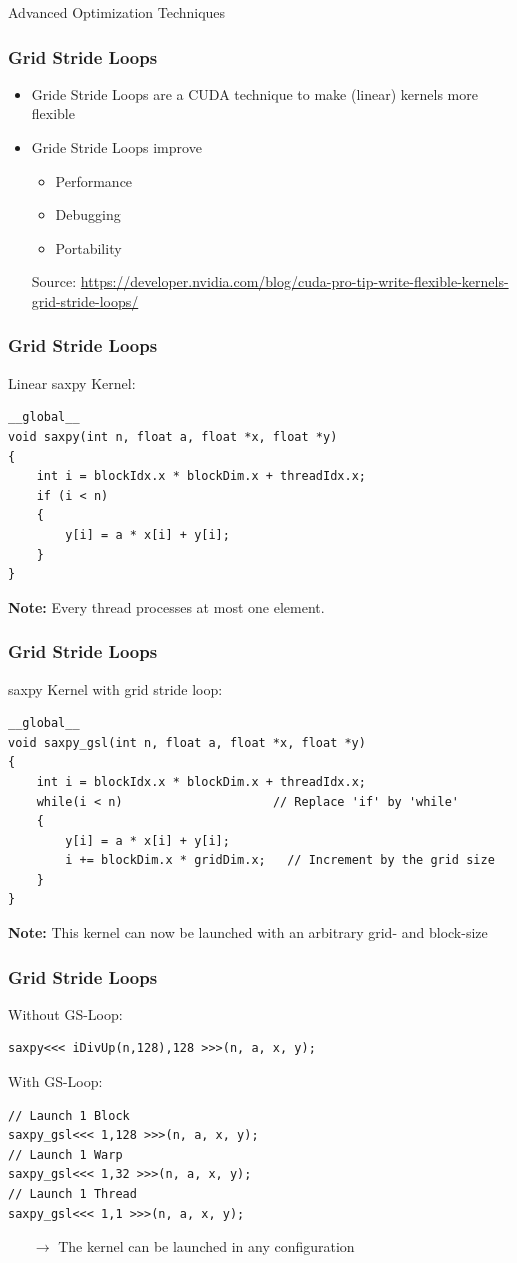 \documentclass[aspectratio=169,handout]{beamer}
\begin{document}
\frame
{
\begin{center}
\Large Advanced Optimization Techniques
\end{center}
}


\begin{frame}[fragile]
\frametitle{Grid Stride Loops}

\begin{itemize}
\item Gride Stride Loops are a CUDA technique to make (linear) kernels more flexible
\item Gride Stride Loops improve
\begin{itemize}
\item Performance
\item Debugging
\item Portability
\end{itemize}
Source: \url{https://developer.nvidia.com/blog/cuda-pro-tip-write-flexible-kernels-grid-stride-loops/}
\end{itemize}
\end{frame}


\begin{frame}[fragile]
\frametitle{Grid Stride Loops}
Linear saxpy Kernel:
\begin{lstlisting}
__global__
void saxpy(int n, float a, float *x, float *y)
{
	int i = blockIdx.x * blockDim.x + threadIdx.x;
	if (i < n) 
	{
		y[i] = a * x[i] + y[i];
	}
}
\end{lstlisting}
\textbf{Note:} Every thread processes at most one element.
\end{frame}


\begin{frame}[fragile]
\frametitle{Grid Stride Loops}
saxpy Kernel with grid stride loop:
\begin{lstlisting}
__global__
void saxpy_gsl(int n, float a, float *x, float *y)
{
	int i = blockIdx.x * blockDim.x + threadIdx.x; 
	while(i < n)                     // Replace 'if' by 'while'
	{
		y[i] = a * x[i] + y[i];
		i += blockDim.x * gridDim.x;   // Increment by the grid size
	}
}
\end{lstlisting}
\textbf{Note:} This kernel can now be launched with an arbitrary grid- and block-size
\end{frame}




\begin{frame}[fragile]
\frametitle{Grid Stride Loops}
Without GS-Loop:
\begin{lstlisting}
saxpy<<< iDivUp(n,128),128 >>>(n, a, x, y);
\end{lstlisting}
With GS-Loop:
\begin{lstlisting}
// Launch 1 Block
saxpy_gsl<<< 1,128 >>>(n, a, x, y);
// Launch 1 Warp
saxpy_gsl<<< 1,32 >>>(n, a, x, y);
// Launch 1 Thread
saxpy_gsl<<< 1,1 >>>(n, a, x, y);
\end{lstlisting}
\begin{itemize}
	\item[$\rightarrow$] The kernel can be launched in any configuration
\end{itemize}
\end{frame}
\end{document}
